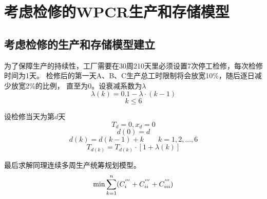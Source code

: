 %
%
%
%
%

\chapter{考虑检修的WPCR生产和存储模型}

\section{考虑检修的生产和存储模型建立}

为了保障生产的持续性，工厂需要在30周210天里必须设置7次停工检修，每次检修时间为1天。
检修后的第一天A、B、C生产总工时限制将会放宽10\%，随后逐日减少放宽2\%的比例，
直至为0。设衰减系数为$\lambda$
\begin{equation}
    \lambda (k)=0.1-\lambda \cdot (k-1)
\end{equation}
\begin{equation}
    k \leq 6
\end{equation}

设检修当天为第$d$天
\begin{equation}
    T_d=0,x_d=0
\end{equation}
\begin{equation}
    d(0)=d
\end{equation}
\begin{equation}
    d(k)=d(k-1)+k \qquad k=1,2,...,6
\end{equation}
\begin{equation}
    T_{d(k)}=T_{d(k)}\cdot [1+\lambda(k)]
\end{equation}

最后求解同理连续多周生产统筹规划模型。
\begin{equation}
    \min\sum_{k=1}^{n}(
            C_{\uppercase\expandafter{\romannumeral1}}^{'''}+
            C_{\uppercase\expandafter{\romannumeral2}}^{'''}+
            C_{\uppercase\expandafter{\romannumeral3}}^{'''}) 
\end{equation}

